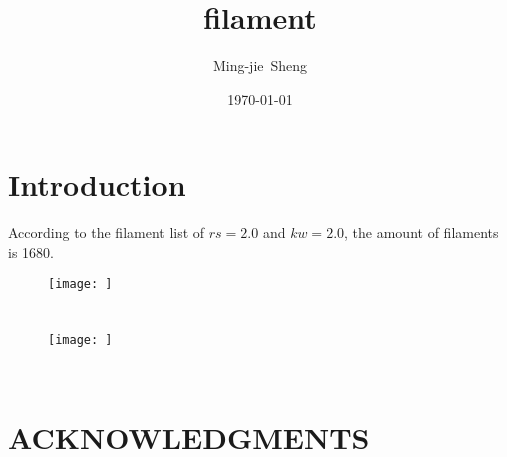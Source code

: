 \documentclass[aps,prd,twocolumn,superscriptaddress,amsfont,amssymb,amsmath,nofootinbib,showpacs,balancelastpage]{revtex4-1}
\begin{document}
\addtolength{\hoffset}{-0.525cm}
\addtolength{\textwidth}{1.05cm}
\title{filament}

\author{Ming-jie~Sheng}


\date{\today}

\begin{abstract}

\end{abstract}


\maketitle

\section{Introduction}\label{sec.intro}
According to the filament list of $rs=2.0$ and $kw=2.0$, the amount of filaments is 1680.

\begin{figure}
 \centering
  \texttt{[image: ]}
  \caption{}
  \label{fig.projection}
\end{figure}


\section{}\label{sec.method}


\subsection{}\label{ss.sim}


\begin{figure}[t] \centering
  \texttt{[image: ]}
  \caption{}
  \label{fig.corr}
\end{figure}



\subsection{}\label{ss.reco}
\begin{equation}
    
\end{equation}

\section{}\label{sec.results}

\section{}\label{sec.discussion}


\section*{ACKNOWLEDGMENTS}


%


\end{document}
